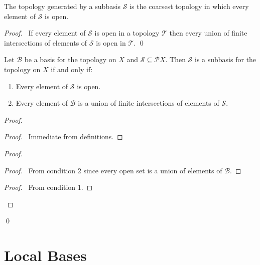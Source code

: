 \begin{prop}
  \label{prop:subbasis:coarsest}
  The topology generated by a subbasis $\mathcal{S}$ is the coarsest topology in which every element of $\mathcal{S}$ is open.
\end{prop}

\begin{proof}
  \pf\ If every element of $\mathcal{S}$ is open in a topology $\mathcal{T}$ then every union of finite intersections of elements of $\mathcal{S}$ is open in $\mathcal{T}$. \qed
\end{proof}

\begin{prop}
  \label{prop:subbasis:from_basis}
  Let $\mathcal{B}$ be a basis for the topology on $X$ and $\mathcal{S} \subseteq \mathcal{P} X$. Then $\mathcal{S}$ is a subbasis for the topology on $X$ if and only if:
  \begin{enumerate}
    \item
    Every element of $\mathcal{S}$ is open.
    \item
    Every element of $\mathcal{B}$ is a union of finite intersections of elements of $\mathcal{S}$.
  \end{enumerate}
\end{prop}

\begin{proof}
  \pf
  \begin{proof}
    \pf\ Immediate from definitions.
  \end{proof}
  \begin{proof}
    \begin{proof}
      \pf\ From condition 2 since every open set is a union of elements of $\mathcal{B}$.
    \end{proof}
    \begin{proof}
      \pf\ From condition 1.
    \end{proof}
  \end{proof}
  \qed
\end{proof}

\section{Local Bases}


